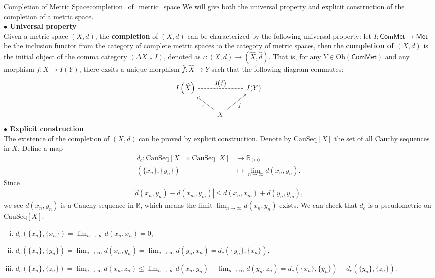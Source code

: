 \documentclass{report}
\begin{document}
\begin{definition}{Completion of Metric Space}{completion_of_metric_space}
	We will give both the universal property and explicit construction of the completion of a metric space.\\
	\textbf{$\bullet$ Universal property}\\
	Given a metric space $(X,d)$, the \textbf{completion} of $(X,d)$ can be characterized by the following universal property: let $I: \mathsf{ComMet}\to\mathsf{Met}$ be the inclusion functor from the category of complete metric spaces to the category of metric spaces, then the \textbf{completion of $(X,d)$} is the initial object of the comma category $\left(\Delta X\downarrow I\right)$, denoted as $\iota:(X,d)\to\left(\widehat{X},\hat{d}\right)$. That is, for any $Y\in\mathrm{Ob}(\mathsf{ComMet})$ and any morphism $f:X\to I(Y)$, there exsits a unique morphism $\hat{f}:\widehat{X}\to Y$ such that the following diagram commutes:
	\[
		\begin{tikzcd}
			I\left(\widehat{X}\right) \arrow[rr, "I\left(\hat{f}\right)", dashed] &                                        & I(Y) \\
																			  & X \arrow[lu, "\iota"] \arrow[ru, "f"'] &     
	\end{tikzcd}
	\]
	\textbf{$\bullet$ Explicit construction}\\
	The existence of the completion of $(X,d)$ can be proved by explicit construction. Denote by $\mathrm{CauSeq}[X]$ the set of all Cauchy sequences in $X$. Define a map
	\begin{align*}
		d_c:\mathrm{CauSeq}[X]\times\mathrm{CauSeq}[X]&\longrightarrow\mathbb{R}_{\ge 0}\\
		\left(\{x_n\},\{y_n\}\right)&\longmapsto\lim_{n\to\infty}d(x_n,y_n).
	\end{align*}
	Since 
	\begin{align*}
		|d(x_n,y_n)-d(x_m,y_m)|\le d(x_n,x_m)+d(y_n,y_m),
	\end{align*}
    we see $d(x_n,y_n)$ is a Cauchy sequence in $\mathbb{R}$, which means the limit $\lim_{n\to\infty}d(x_n,y_n)$ exists. We can check that $d_c$ is a pseudometric on $\mathrm{CauSeq}[X]$:
	\begin{enumerate}[(i)]
		\item $d_c(\{x_n\},\{x_n\})=\lim_{n\to\infty}d(x_n,x_n)=0$,
		\item $d_c(\{x_n\},\{y_n\})=\lim_{n\to\infty}d(x_n,y_n)=\lim_{n\to\infty}d(y_n,x_n)=d_c(\{y_n\},\{x_n\})$,
		\item $d_c(\{x_n\},\{z_n\})=\lim_{n\to\infty}d(x_n,z_n)\le\lim_{n\to\infty}d(x_n,y_n)+\lim_{n\to\infty}d(y_n,z_n)=d_c(\{x_n\},\{y_n\})+d_c(\{y_n\},\{z_n\})$.

\end{enumerate}
\end{definition}
\end{document}

